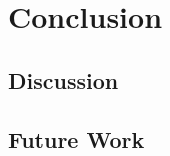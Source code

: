 \chapter{Conclusion}
\blindtext

\section{Discussion}
\Blindtext
\Blindtext

\section{Future Work}
\Blindtext